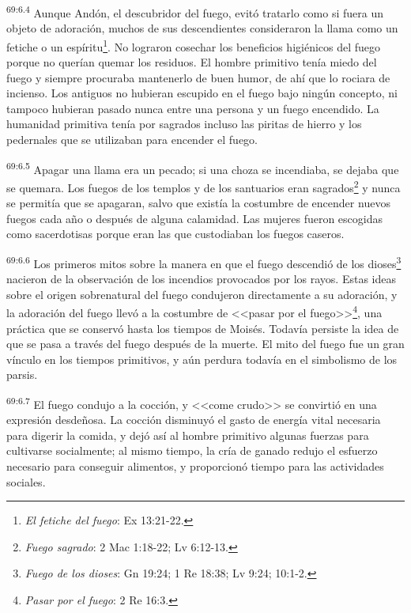 \documentclass[twoside, 11pt]{book}
\begin{document}
\par
\textsuperscript{69:6.4} Aunque Andón, el descubridor del fuego, evitó tratarlo como si fuera un objeto de adoración, muchos de sus descendientes consideraron la llama como un fetiche o un espíritu\footnote{\textit{El fetiche del fuego}: Ex 13:21-22.}. No lograron cosechar los beneficios higiénicos del fuego porque no querían quemar los residuos. El hombre primitivo tenía miedo del fuego y siempre procuraba mantenerlo de buen humor, de ahí que lo rociara de incienso. Los antiguos no hubieran escupido en el fuego bajo ningún concepto, ni tampoco hubieran pasado nunca entre una persona y un fuego encendido. La humanidad primitiva tenía por sagrados incluso las piritas de hierro y los pedernales que se utilizaban para encender el fuego.

\par
\textsuperscript{69:6.5} Apagar una llama era un pecado; si una choza se incendiaba, se dejaba que se quemara. Los fuegos de los templos y de los santuarios eran sagrados\footnote{\textit{Fuego sagrado}: 2 Mac 1:18-22; Lv 6:12-13.} y nunca se permitía que se apagaran, salvo que existía la costumbre de encender nuevos fuegos cada año o después de alguna calamidad. Las mujeres fueron escogidas como sacerdotisas porque eran las que custodiaban los fuegos caseros.

\par
\textsuperscript{69:6.6} Los primeros mitos sobre la manera en que el fuego descendió de los dioses\footnote{\textit{Fuego de los dioses}: Gn 19:24; 1 Re 18:38; Lv 9:24; 10:1-2.} nacieron de la observación de los incendios provocados por los rayos. Estas ideas sobre el origen sobrenatural del fuego condujeron directamente a su adoración, y la adoración del fuego llevó a la costumbre de <<pasar por el fuego>>\footnote{\textit{Pasar por el fuego}: 2 Re 16:3.}, una práctica que se conservó hasta los tiempos de Moisés. Todavía persiste la idea de que se pasa a través del fuego después de la muerte. El mito del fuego fue un gran vínculo en los tiempos primitivos, y aún perdura todavía en el simbolismo de los parsis.

\par
\textsuperscript{69:6.7} El fuego condujo a la cocción, y <<come crudo>> se convirtió en una expresión desdeñosa. La cocción disminuyó el gasto de energía vital necesaria para digerir la comida, y dejó así al hombre primitivo algunas fuerzas para cultivarse socialmente; al mismo tiempo, la cría de ganado redujo el esfuerzo necesario para conseguir alimentos, y proporcionó tiempo para las actividades sociales.
\end{document}
